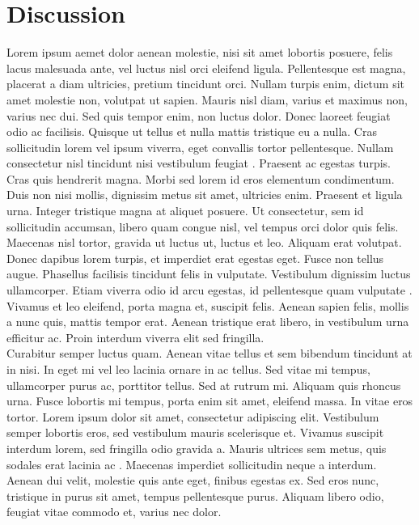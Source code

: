 \documentclass[a4paper,12pt]{article}
\begin{document}
\section{Discussion}
Lorem \cite{RN45} ipsum aemet\cite{RN394} dolor aenean molestie, nisi sit amet lobortis posuere, felis lacus malesuada ante, vel luctus nisl orci eleifend ligula. Pellentesque est magna, placerat a diam ultricies, pretium tincidunt orci. Nullam turpis enim, dictum sit amet molestie non, volutpat ut sapien. Mauris nisl diam, varius et maximus non, varius nec dui. Sed quis tempor enim, non luctus dolor. Donec laoreet feugiat odio ac facilisis. Quisque ut tellus et nulla mattis tristique eu a nulla. Cras sollicitudin lorem vel ipsum viverra, eget convallis tortor pellentesque. Nullam consectetur nisl tincidunt nisi vestibulum feugiat \cite{RN420,RN877}. Praesent ac egestas turpis. Cras quis hendrerit magna. Morbi sed lorem id eros elementum condimentum.\\
Duis non nisi mollis, dignissim metus sit amet, ultricies enim. Praesent et ligula urna. Integer tristique magna at aliquet posuere. Ut consectetur, sem id sollicitudin accumsan, libero quam congue nisl, vel tempus orci dolor quis felis. Maecenas nisl tortor, gravida ut luctus ut, luctus et leo. Aliquam erat volutpat. Donec dapibus lorem turpis, et imperdiet erat egestas eget. Fusce non tellus augue. Phasellus facilisis tincidunt felis in vulputate. Vestibulum dignissim luctus ullamcorper. Etiam viverra odio id arcu egestas, id pellentesque quam vulputate \cite{RN1039,RN795,RN962}. Vivamus et leo eleifend, porta magna et, suscipit felis. Aenean sapien felis, mollis a nunc quis, mattis tempor erat. Aenean tristique erat libero, in vestibulum urna efficitur ac. Proin interdum viverra elit sed fringilla.\\
Curabitur semper luctus quam. Aenean vitae tellus et sem bibendum tincidunt at in nisi. In eget mi vel leo lacinia ornare in ac tellus. Sed vitae mi tempus, ullamcorper purus ac, porttitor tellus. Sed at rutrum mi. Aliquam quis rhoncus urna. Fusce lobortis mi tempus, porta enim sit amet, eleifend massa. In vitae eros tortor. Lorem ipsum dolor sit amet, consectetur adipiscing elit. Vestibulum semper lobortis eros, sed vestibulum mauris scelerisque et. Vivamus suscipit interdum lorem, sed fringilla odio gravida a. Mauris ultrices sem metus, quis sodales erat lacinia ac \cite{RN632}. Maecenas imperdiet sollicitudin neque a interdum. Aenean dui velit, molestie quis ante eget, finibus egestas ex. Sed eros nunc, tristique in purus sit amet, tempus pellentesque purus. Aliquam libero odio, feugiat vitae commodo et, varius nec dolor.\\
\end{document}
